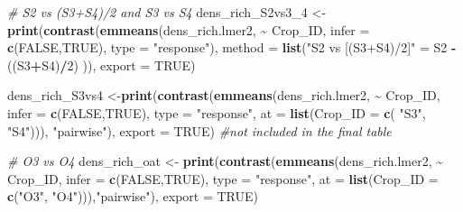 \documentclass[
]{article}
\newenvironment{Shaded}{\begin{snugshade}}{\end{snugshade}}
\newcommand{\AttributeTok}[1]{\textcolor[rgb]{0.13,0.29,0.53}{#1}}
\newcommand{\CommentTok}[1]{\textcolor[rgb]{0.56,0.35,0.01}{\textit{#1}}}
\newcommand{\ConstantTok}[1]{\textcolor[rgb]{0.56,0.35,0.01}{#1}}
\newcommand{\DecValTok}[1]{\textcolor[rgb]{0.00,0.00,0.81}{#1}}
\newcommand{\FunctionTok}[1]{\textcolor[rgb]{0.13,0.29,0.53}{\textbf{#1}}}
\newcommand{\NormalTok}[1]{#1}
\newcommand{\OtherTok}[1]{\textcolor[rgb]{0.56,0.35,0.01}{#1}}
\newcommand{\SpecialCharTok}[1]{\textcolor[rgb]{0.81,0.36,0.00}{\textbf{#1}}}
\newcommand{\StringTok}[1]{\textcolor[rgb]{0.31,0.60,0.02}{#1}}
\begin{document}
\begin{Shaded}
\begin{Highlighting}[]
\CommentTok{\# S2 vs (S3+S4)/2 and S3 vs S4}
\NormalTok{dens\_rich\_S2vs3\_4 }\OtherTok{\textless{}{-}} \FunctionTok{print}\NormalTok{(}\FunctionTok{contrast}\NormalTok{(}\FunctionTok{emmeans}\NormalTok{(dens\_rich.lmer2, }\SpecialCharTok{\textasciitilde{}}\NormalTok{ Crop\_ID, }
                                            \AttributeTok{infer =} \FunctionTok{c}\NormalTok{(}\ConstantTok{FALSE}\NormalTok{,}\ConstantTok{TRUE}\NormalTok{),}
                                            \AttributeTok{type =} \StringTok{"response"}\NormalTok{),}
                                    \AttributeTok{method =} \FunctionTok{list}\NormalTok{(}\StringTok{"S2 vs [(S3+S4)/2]"} \OtherTok{=}\NormalTok{ S2 }\SpecialCharTok{{-}}\NormalTok{ ((S3}\SpecialCharTok{+}\NormalTok{S4)}\SpecialCharTok{/}\DecValTok{2}\NormalTok{) )), }
                           \AttributeTok{export =} \ConstantTok{TRUE}\NormalTok{)}

\NormalTok{dens\_rich\_S3vs4 }\OtherTok{\textless{}{-}}\FunctionTok{print}\NormalTok{(}\FunctionTok{contrast}\NormalTok{(}\FunctionTok{emmeans}\NormalTok{(dens\_rich.lmer2, }\SpecialCharTok{\textasciitilde{}}\NormalTok{ Crop\_ID,}
                                         \AttributeTok{infer =} \FunctionTok{c}\NormalTok{(}\ConstantTok{FALSE}\NormalTok{,}\ConstantTok{TRUE}\NormalTok{), }
                                         \AttributeTok{type =} \StringTok{"response"}\NormalTok{, }
                                         \AttributeTok{at =} \FunctionTok{list}\NormalTok{(}\AttributeTok{Crop\_ID =} \FunctionTok{c}\NormalTok{( }\StringTok{"S3"}\NormalTok{, }\StringTok{"S4"}\NormalTok{))), }\StringTok{"pairwise"}\NormalTok{), }
                        \AttributeTok{export =} \ConstantTok{TRUE}\NormalTok{) }\CommentTok{\#not included in the final table}

\CommentTok{\# O3 vs O4}
\NormalTok{dens\_rich\_oat }\OtherTok{\textless{}{-}} \FunctionTok{print}\NormalTok{(}\FunctionTok{contrast}\NormalTok{(}\FunctionTok{emmeans}\NormalTok{(dens\_rich.lmer2, }\SpecialCharTok{\textasciitilde{}}\NormalTok{ Crop\_ID,}
                                        \AttributeTok{infer =} \FunctionTok{c}\NormalTok{(}\ConstantTok{FALSE}\NormalTok{,}\ConstantTok{TRUE}\NormalTok{), }
                                        \AttributeTok{type =} \StringTok{"response"}\NormalTok{,}
                                        \AttributeTok{at =} \FunctionTok{list}\NormalTok{(}\AttributeTok{Crop\_ID =} \FunctionTok{c}\NormalTok{(}\StringTok{"O3"}\NormalTok{, }\StringTok{"O4"}\NormalTok{))),}\StringTok{"pairwise"}\NormalTok{), }\AttributeTok{export =} \ConstantTok{TRUE}\NormalTok{)}


\end{Highlighting}
\end{Shaded}
\end{document}
